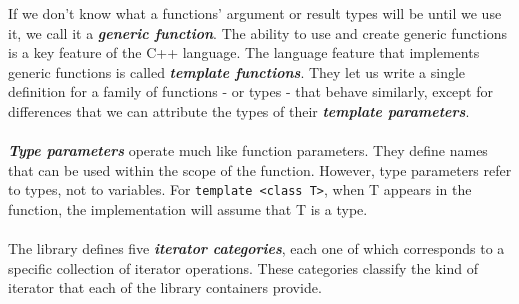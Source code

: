 \documentclass[12p, a4paper]{article}
\begin{document}
If we don't know what a functions' argument or result types will be until we use it, we call it a \textbf{\textit{generic function}}. The ability to use and create generic functions is a key feature of the C++ language. The language feature that implements generic functions is called \textbf{\textit{template functions}}. They let us write a single definition for a family of functions - or types - that behave similarly, except for differences that we can attribute the types of their \textbf{\textit{template parameters}}.\\
\\

\textbf{\textit{Type parameters}} operate much like function parameters. They define names that can be used within the scope of the function. However, type parameters refer to types, not to variables. For \texttt{template <class T>}, when T appears in the function, the implementation will assume that T is a type. \\
\\

The library defines five \textbf{\textit{iterator categories}}, each one of which corresponds to a specific collection of iterator operations. These categories classify the kind of iterator that each of the library containers provide.\\
\\
\end{document}
